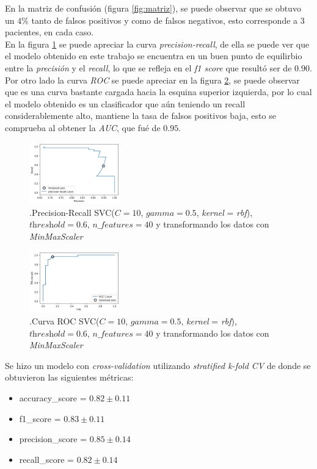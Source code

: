 \documentclass[6pt, twocolumn]{article}
\begin{document}
En la matriz de confusión (figura \ref{fig:matriz}), se puede observar que se obtuvo un $4\%$ tanto de falsos positivos y como de  falsos negativos, esto corresponde a $3$ pacientes, en cada caso. \\ 
En la figura \ref{fig:pr} se puede apreciar la curva \textit{precision-recall}, de ella se puede ver que el modelo obtenido en este trabajo se encuentra en un buen punto de equilirbio entre la \textit{precisión} y el \textit{recall}, lo que se refleja en el \textit{f1 score} que resultó ser de $0.90$. \\
Por otro lado la curva \textit{ROC} se puede apreciar en la figura \ref{fig:lear}, se puede observar que es una curva bastante cargada hacia la esquina superior izquierda, por lo cual el modelo obtenido es un clasificador que aún teniendo un recall considerablemente alto, mantiene la tasa de falsos positivos baja, esto se comprueba al obtener la \textit{AUC}, que fué de  $0.95$. 
\begin{figure}
\centering
\includegraphics[width = 0.35\textwidth]{./precision_recall.png}
\caption{\footnotesize \label{fig:pr}.Precision-Recall  SVC($C = 10$, $gamma = 0.5$, \textit{kernel} = \textit{rbf}), $\textit{threshold} = 0.6$, $n\_features = 40$ y transformando los datos con \textit{MinMaxScaler}}
\end{figure}

\begin{figure}
\centering
\includegraphics[width = 0.35\textwidth]{./ROC.png}
\caption{\footnotesize \label{fig:lear}.Curva ROC SVC($C = 10$, $gamma = 0.5$, \textit{kernel} = \textit{rbf}), $\textit{threshold} = 0.6$, $n\_features = 40$ y transformando los datos con \textit{MinMaxScaler}}
\end{figure}

Se hizo un modelo con \textit{cross-validation} utilizando \textit{stratified k-fold CV} de donde se obtuvieron las siguientes métricas:
\begin{itemize}
\item accuracy\_score = $0.82 \pm 0.11$
\item f1\_score = $0.83 \pm 0.11$
\item precision\_score = $0.85 \pm 0.14$
\item recall\_score = $0.82 \pm 0.14$
\end{itemize}
\end{document}

